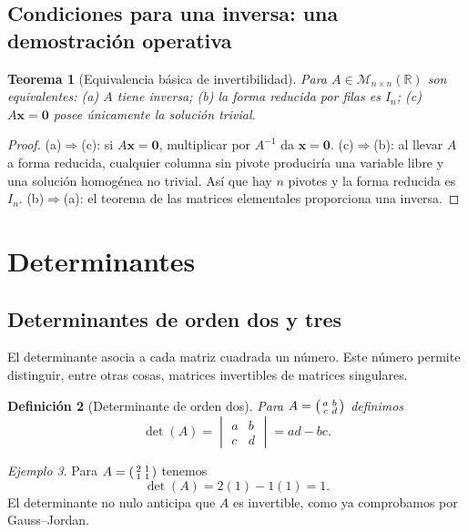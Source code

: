 \documentclass[12pt]{article}
\newtheorem{definicion}{Definición}[section]
\newtheorem{teorema}[definicion]{Teorema}
\theoremstyle{remark}
\newtheorem{ejemplo}[definicion]{Ejemplo}
\newcommand{\R}{\mathbb{R}}
\newcommand{\Mat}[2]{\mathcal{M}_{#1\times #2}}
\newcommand{\vect}[1]{\boldsymbol{#1}}
\begin{document}
\subsection{Condiciones para una inversa: una demostración operativa}
\begin{teorema}[Equivalencia básica de invertibilidad]
Para $A\in\Mat{n}{n}(\R)$ son equivalentes: (a) $A$ tiene inversa; (b) la forma reducida por filas es $I_n$; (c) $A\vect x=\vect0$ posee únicamente la solución trivial.
\end{teorema}
\begin{proof}
(a)$\Rightarrow$(c): si $A\vect x=\vect0$, multiplicar por $A^{-1}$ da $\vect x=\vect0$. (c)$\Rightarrow$(b): al llevar $A$ a forma reducida, cualquier columna sin pivote produciría una variable libre y una solución homogénea no trivial. Así que hay $n$ pivotes y la forma reducida es $I_n$. (b)$\Rightarrow$(a): el teorema de las matrices elementales proporciona una inversa.
\end{proof}


\section{Determinantes}
\subsection{Determinantes de orden dos y tres}
El determinante asocia a cada matriz cuadrada un número. Este número permite distinguir, entre otras cosas, matrices invertibles de matrices singulares.

\begin{definicion}[Determinante de orden dos]
Para $A=\begin{psmallmatrix}a&b\\c&d\end{psmallmatrix}$ definimos
\[
\det(A)=\begin{vmatrix}a&b\\c&d\end{vmatrix}=ad-bc.
\]
\end{definicion}
\begin{ejemplo}
Para $A=\begin{psmallmatrix}2&1\\1&1\end{psmallmatrix}$ tenemos
\[
\det(A)=2(1)-1(1)=1.
\]
El determinante no nulo anticipa que $A$ es invertible, como ya comprobamos por Gauss--Jordan.
\end{ejemplo}
\end{document}
